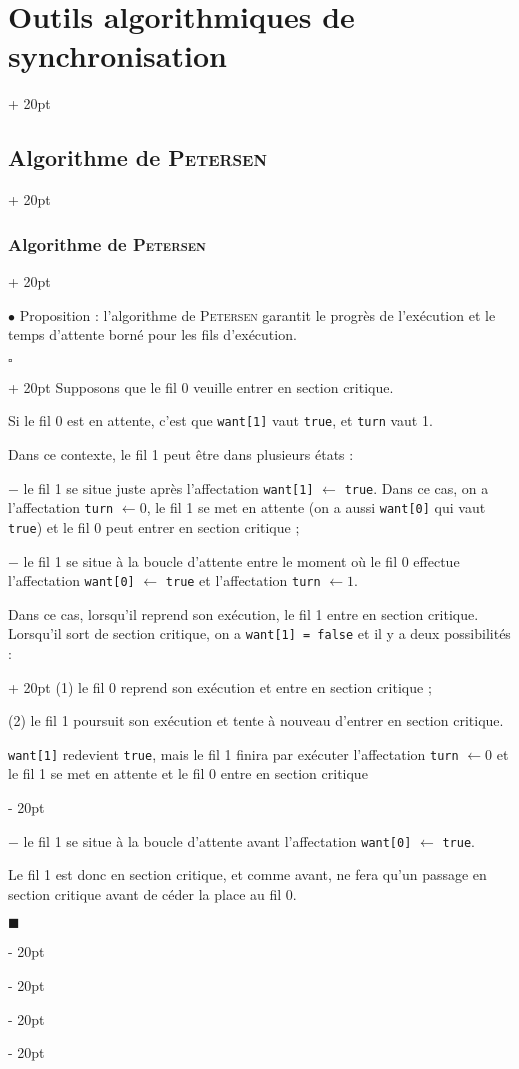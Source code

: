 \documentclass[a4paper, 12pt, twoside]{article}
\newcommand{\ind}[1][20pt]{\advance\leftskip + #1}
\newcommand{\deind}[1][20pt]{\advance\leftskip - #1}
\newenvironment{indt}[2][20pt]{#2 \par \ind[#1]}{\par \deind} %
\newenvironment{proof}[1][{}]{\begin{indt}{$\square$ #1}}{$\blacksquare$ \end{indt}}
\begin{document}
\begin{indt}{\section{Outils algorithmiques de synchronisation}}
\begin{indt}{\subsection{Algorithme de \textsc{Petersen}}}
\begin{indt}{\subsubsection{Algorithme de \textsc{Petersen}}}
                \vspace{12pt}
                
                $\bullet$ Proposition : l'algorithme de \textsc{Petersen} garantit le progrès de l'exécution et le temps d'attente borné pour les fils d'exécution.

                \begin{proof}
                    Supposons que le fil 0 veuille entrer en section critique.

                    Si le fil 0 est en attente, c'est que \texttt{want[1]} vaut \texttt{true}, et \texttt{turn} vaut 1.

                    Dans ce contexte, le fil 1 peut être dans plusieurs états :

                    $-$ le fil 1 se situe juste après l'affectation \texttt{want[1]} $\leftarrow$ \texttt{true}. Dans ce cas, on a l'affectation \texttt{turn} $\leftarrow 0$, le fil 1 se met en attente (on a aussi \texttt{want[0]} qui vaut \texttt{true}) et le fil 0 peut entrer en section critique ;

                    $-$ le fil 1 se situe à la boucle d'attente entre le moment où le fil 0 effectue l'affectation \texttt{want[0]} $\leftarrow$ \texttt{true} et l'affectation \texttt{turn} $\leftarrow 1$.

                    Dans ce cas, lorsqu'il reprend son exécution, le fil 1 entre en section critique.
                    \begin{indt}{Lorsqu'il sort de section critique, on a \texttt{want[1] = false} et il y a deux possibilités :}
                        (1) le fil 0 reprend son exécution et entre en section critique ;

                        (2) le fil 1 poursuit son exécution et tente à nouveau d'entrer en section critique.

                        \texttt{want[1]} redevient \texttt{true}, mais le fil 1 finira par exécuter l'affectation \texttt{turn} $\leftarrow 0$ et le fil 1 se met en attente et le fil 0 entre en section critique
                    \end{indt}

                    $-$ le fil 1 se situe à la boucle d'attente avant l'affectation \texttt{want[0]} $\leftarrow$ \texttt{true}.

                    Le fil 1 est donc en section critique, et comme avant, ne fera qu'un passage en section critique avant de céder la place au fil 0.


\end{proof}
\end{indt}
\end{indt}
\end{indt}
\end{document}
